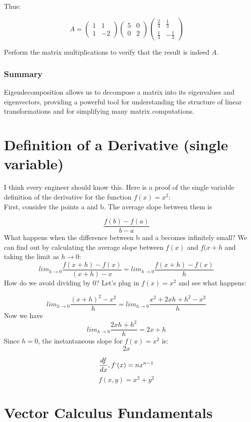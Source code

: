 \documentclass[12pt]{article}
\begin{document}
Thus:

\[ A = \begin{pmatrix} 1 & 1 \\ 1 & -2 \end{pmatrix} \begin{pmatrix} 5 & 0 \\ 0 & 2 \end{pmatrix} \begin{pmatrix} \frac{2}{3} & \frac{1}{3} \\ \frac{1}{3} & -\frac{1}{3} \end{pmatrix} \]

Perform the matrix multiplications to verify that the result is indeed \( A \).

\subsubsection{Summary}
Eigendecomposition allows us to decompose a matrix into its eigenvalues and eigenvectors, providing a powerful tool for understanding the structure of linear transformations and for simplifying many matrix computations.
\section{Definition of a Derivative (single variable)}
I think every engineer should know this. Here is a proof of the single variable definition of the derivative for the function \(f(x) = x^2\):\\
First, consider the points a and b. The average slope between them is

\[\frac{f(b) - f(a)}{b - a}\]
What happens when the difference between b and a becomes infinitely small? We can find out by calculating the average slope between \(f(x)\) and \(f(x+h\) and taking the limit as \(h\rightarrow0\):
\[lim_{h\rightarrow0}\frac{f(x+h) - f(x)}{(x+h)-x} = lim_{h\rightarrow0}\frac{f(x+h) - f(x)}{h}\]
How do we avoid dividing by 0? Let's plug in  \(f(x) = x^2\) and see what happens:

\[ lim_{h\rightarrow0}\frac{(x+h)^2 - x^2}{h} =  lim_{h\rightarrow0}\frac{x^2 + 2xh + h^2 - x^2}{h}\]
Now we have
\[ lim_{h\rightarrow0}\frac{2xh+h^2}{h} = 2x+h\]
Since \(h=0\), the instantaneous slope for \(f(x) = x^2\) is:
\[2x\]


\[\frac{df}{dx}, f`(x) = nx^{n-1}\]
\[f(x,y) = x^2 + y^2\]
\section{Vector Calculus Fundamentals}
\end{document}
